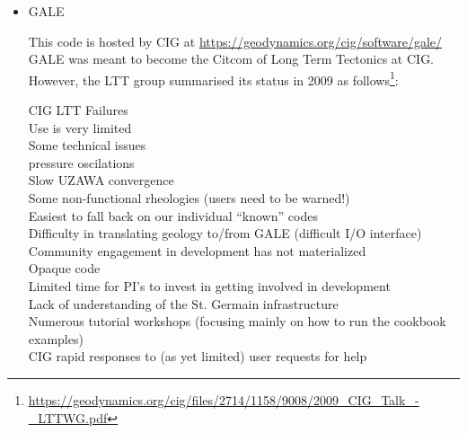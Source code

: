 \begin{itemize}
\begin{scriptsize}
\begin{itemize}
\item[\twothousandeight]     \textcite{hust08b} 
\item[\twothousandeleven]    \textcite{toyu11} 
\item[\twothousandtwelve]    \textcite{nobs12}
\item[\twothousandthirteen]  \textcite{hutm13},  \textcite{plth13},  \textcite{nobr13} 
\item[\twothousandeighteen]  \textcite{plpt18}
\item[\twothousandnineteen]  \textcite{neum19}
\item[\twothousandtwenty]    \textcite{agtb20},  \textcite{sctp20}
\end{itemize}
\end{scriptsize}

\item {\codefont GALE} 

This code is hosted by CIG at \url{https://geodynamics.org/cig/software/gale/}
GALE was meant to become the Citcom of Long Term Tectonics at CIG. However, 
the LTT group summarised its status in 2009 as 
follows\footnote{\url{https://geodynamics.org/cig/files/2714/1158/9008/2009_CIG_Talk_-_LTTWG.pdf}}:

\hspace{1cm}
\begin{minipage}[t]{0.75\textwidth}
CIG LTT Failures\\
Use is very limited\\
Some technical issues\\
pressure oscilations\\
Slow UZAWA convergence\\
Some non-functional rheologies (users need to be warned!)\\
Easiest to fall back on our individual ``known'' codes\\
Difficulty in translating geology to/from GALE (difficult I/O interface)\\
Community engagement in development has not materialized \\
Opaque code\\
Limited time for PI's to invest in getting involved in development\\
Lack of understanding of the St. Germain infrastructure\\
Numerous tutorial workshops (focusing mainly on how to run the cookbook examples)\\
CIG rapid responses to (as yet limited) user requests for help
\end{minipage}


\end{itemize}
